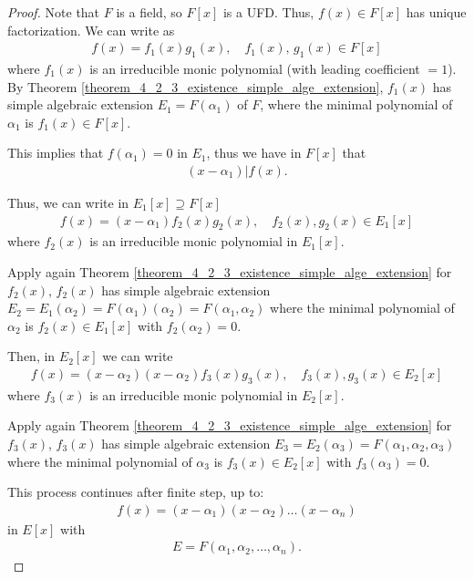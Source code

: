 \documentclass[utf8]{ctexbook}
\begin{document}
\begin{proof}
Note that $F$ is a field, so $F[x]$ is a UFD. Thus, $f(x) \in F[x]$ has unique factorization. We can write as
\begin{align*}
f(x) = f_1 (x) g_1 (x), \quad f_1 (x), \, g_1 (x) \in F[x]
\end{align*}
where $f_1 (x) $ is an irreducible monic polynomial (with leading coefficient $=1$). By Theorem \ref{theorem_4_2_3_existence_simple_alge_extension}, $f_1(x)$ has simple algebraic extension $E_1 = F(\alpha_1)$ of $F$, where the minimal polynomial of $\alpha_1$ is $f_1(x) \in F[x]$.  

This implies that $f(\alpha_1 ) =0 $ in $E_1$, thus we have in $F[x]$ that
\begin{align*}
(x-\alpha_1) | f(x) .
\end{align*}

Thus, we can write in $E_1[x] \supseteq F[x]$ 
\begin{align*}
f(x) = (x- \alpha_1) f_2 (x) g_2 (x), \quad f_2 (x) , g_2 (x) \in E_1 [x]
\end{align*}
where $f_2(x)$ is an irreducible monic polynomial in $E_1 [x]$.

Apply again Theorem \ref{theorem_4_2_3_existence_simple_alge_extension} for $f_2 (x)$, $f_2(x)$ has simple algebraic extension $E_2 = E_1 (\alpha_2) = F(\alpha_1) (\alpha_2) = F(\alpha_1, \alpha_2)$ where the minimal polynomial of $\alpha_2$ is $f_2 (x) \in E_1 [x]$ with $f_2 (\alpha_2) = 0$.

Then, in $E_2 [x]$ we can write
\begin{align*}
f(x) = (x-\alpha_2) (x - \alpha_2) f_3 (x) g_3(x),\quad  f_3(x), g_3(x) \in E_2 [x]
\end{align*}
where $f_3(x)$ is an irreducible monic polynomial in $E_2 [x]$.

Apply again Theorem \ref{theorem_4_2_3_existence_simple_alge_extension} for $f_3(x) $, $f_3(x)$ has simple algebraic extension $E_3 = E_2 (\alpha_3) = F(\alpha_1, \alpha_2, \alpha_3)$ where the minimal polynomial of $\alpha_3$ is $f_3(x) \in E_2 [x]$ with $f_3 (\alpha_3)=0$.

This process continues after finite step, up to:
\begin{align*}
f(x) = (x- \alpha_1 ) (x - \alpha_2 ) \ldots (x - \alpha_n)
\end{align*}
in $E[x]$ with
\begin{align*}
E = F(\alpha_1, \alpha_2 , \ldots, \alpha_n).
\end{align*}


\end{proof}
\end{document}

